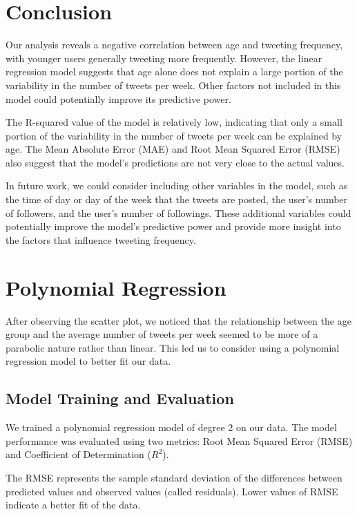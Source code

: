 \documentclass{article}
\begin{document}
\section{Conclusion}

Our analysis reveals a negative correlation between age and tweeting frequency, with younger users generally tweeting more frequently. However, the linear regression model suggests that age alone does not explain a large portion of the variability in the number of tweets per week. Other factors not included in this model could potentially improve its predictive power. 

The R-squared value of the model is relatively low, indicating that only a small portion of the variability in the number of tweets per week can be explained by age. The Mean Absolute Error (MAE) and Root Mean Squared Error (RMSE) also suggest that the model's predictions are not very close to the actual values. 

In future work, we could consider including other variables in the model, such as the time of day or day of the week that the tweets are posted, the user's number of followers, and the user's number of followings. These additional variables could potentially improve the model's predictive power and provide more insight into the factors that influence tweeting frequency.


\section{Polynomial Regression}

After observing the scatter plot, we noticed that the relationship between the age group and the average number of tweets per week seemed to be more of a parabolic nature rather than linear. This led us to consider using a polynomial regression model to better fit our data.

\subsection{Model Training and Evaluation}

We trained a polynomial regression model of degree 2 on our data. The model performance was evaluated using two metrics: Root Mean Squared Error (RMSE) and Coefficient of Determination ($R^2$).

The RMSE represents the sample standard deviation of the differences between predicted values and observed values (called residuals). Lower values of RMSE indicate a better fit of the data.
\end{document}

